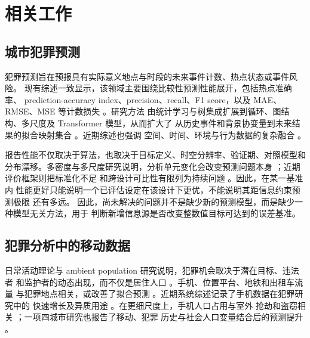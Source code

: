 \section{相关工作}
\label{sec:related_work}

\subsection{城市犯罪预测}
\label{subsec:related_crime_forecasting}

犯罪预测旨在预报具有实际意义地点与时段的未来事件计数、热点状态或事件风险。
现有综述一致显示，该领域主要围绕比较性预测性能展开，包括热点准确率、
prediction-accuracy index、precision、recall、F1 score，以及 MAE、RMSE、MSE
等计数损失 \citep{kounadi2020review,du2023review,mandalapu2023review}。研究方法
由统计学习与树集成扩展到循环、图结构、多尺度及 Transformer 模型，从而扩大了
从历史事件和背景协变量到未来结果的拟合映射集合
\citep{alves2018crime,angbera2023model,huang2018deepcrime,deng2023risk,
jing2024multiscale,wang2025mragnn,butt2025start,cui2026transfer}。近期综述也强调
空间、时间、环境与行为数据的复杂融合 \citep{hu2023fusion}。

报告性能不仅取决于算法，也取决于目标定义、时空分辨率、验证期、对照模型和
分布漂移。多密度与多尺度研究说明，分析单元变化会改变预测问题本身
\citep{cesario2024multidensity,jing2024multiscale}；近期评价框架则把标准化不足
和跨设计可比性有限列为持续问题 \citep{amarante2025steval}。因此，在某一基准内
性能更好只能说明一个已评估设定在该设计下更优，不能说明其距信息约束预测极限
还有多远。
因此，尚未解决的问题并不是缺少新的预测模型，而是缺少一种模型无关方法，用于
判断新增信息源是否改变整数值目标可达到的误差基准。

\subsection{犯罪分析中的移动数据}
\label{subsec:related_mobility_crime}

日常活动理论与 ambient population 研究说明，犯罪机会取决于潜在目标、违法者
和监护者的动态出现，而不仅是居住人口
\citep{cohen1979routine,malleson2016ambient}。手机、位置平台、地铁和出租车流量
与犯罪地点相关，或改善了拟合预测
\citep{song2019legal,kadar2018mining,kadar2020mobility,wu2022mobility,
rummens2021mobile,schertz2021street}。近期系统综述记录了手机数据在犯罪研究中的
快速增长及异质用途 \citep{okmi2023mobile}。在更细尺度上，手机人口占用与室外
抢劫和盗窃相关 \citep{valente2024routines}；一项四城市研究也报告了移动、犯罪
历史与社会人口变量结合后的预测提升 \citep{albors2025mobility}。


